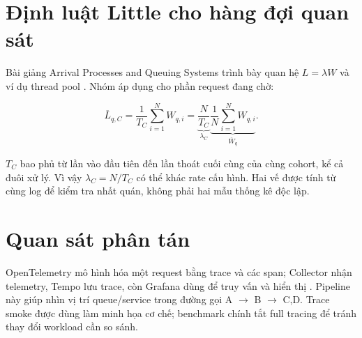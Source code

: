 \section{Định luật Little cho hàng đợi quan sát}

Bài giảng Arrival Processes and Queuing Systems trình bày quan hệ
$L=\lambda W$ và ví dụ thread pool \cite{nt531-queue-lecture}. Nhóm áp dụng cho
phần request đang chờ:

\begin{equation}
\overline L_{q,C}=\frac{1}{T_C}\sum_{i=1}^{N}W_{q,i}
=\underbrace{\frac{N}{T_C}}_{\lambda_C}
 \underbrace{\frac{1}{N}\sum_{i=1}^{N}W_{q,i}}_{\overline W_q}.
\end{equation}

$T_C$ bao phủ từ lần vào đầu tiên đến lần thoát cuối cùng của cùng cohort, kể
cả đuôi xử lý. Vì vậy $\lambda_C=N/T_C$ có thể khác rate cấu hình. Hai vế được
tính từ cùng log để kiểm tra nhất quán, không phải hai mẫu thống kê độc lập.

\section{Quan sát phân tán}

OpenTelemetry mô hình hóa một request bằng trace và các span; Collector nhận
telemetry, Tempo lưu trace, còn Grafana dùng để truy vấn và hiển thị
\cite{otel-docs}. Pipeline này giúp nhìn vị trí queue/service trong đường gọi
A $\rightarrow$ B $\rightarrow$ C,D. Trace smoke được dùng làm minh họa cơ chế;
benchmark chính tắt full tracing để tránh thay đổi workload cần so sánh.
